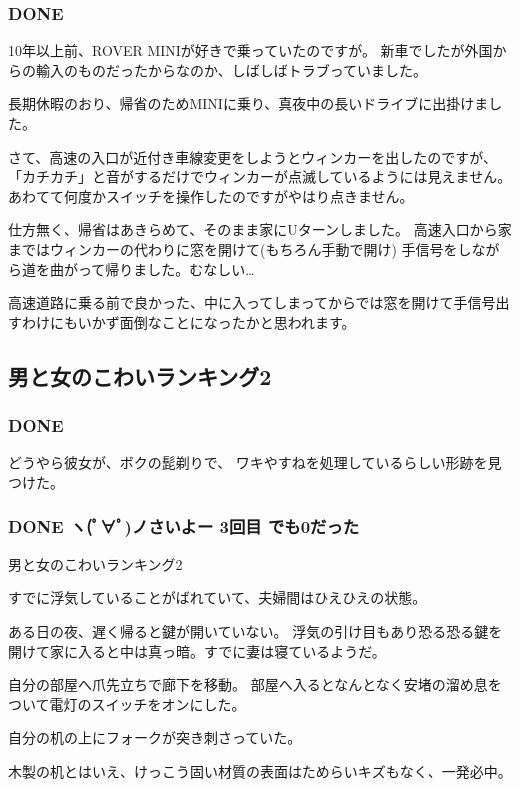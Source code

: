 \documentclass[11pt]{article}
\begin{document}
\subsubsection{\textbf{DONE}}
\label{sec-122_1_1}

10年以上前、ROVER MINIが好きで乗っていたのですが。
新車でしたが外国からの輸入のものだったからなのか、しばしばトラブっていました。

長期休暇のおり、帰省のためMINIに乗り、真夜中の長いドライブに出掛けました。

さて、高速の入口が近付き車線変更をしようとウィンカーを出したのですが、「カチカチ」と音がするだけでウィンカーが点滅しているようには見えません。
あわてて何度かスイッチを操作したのですがやはり点きません。

仕方無く、帰省はあきらめて、そのまま家にUターンしました。
高速入口から家まではウィンカーの代わりに窓を開けて(もちろん手動で開け) 手信号をしながら道を曲がって帰りました。むなしい\ldots{}

高速道路に乗る前で良かった、中に入ってしまってからでは窓を開けて手信号出すわけにもいかず面倒なことになったかと思われます。
\subsection{男と女のこわいランキング2}
\label{sec-122_2}
\subsubsection{\textbf{DONE}}
\label{sec-122_2_1}

どうやら彼女が、ボクの髭剃りで、
ワキやすねを処理しているらしい形跡を見つけた。
\subsubsection{\textbf{DONE} ヽ(ﾟ∀ﾟ)ノさいよー 3回目 でも0だった}
\label{sec-122_2_2}

男と女のこわいランキング2
 
すでに浮気していることがばれていて、夫婦間はひえひえの状態。

ある日の夜、遅く帰ると鍵が開いていない。
浮気の引け目もあり恐る恐る鍵を開けて家に入ると中は真っ暗。すでに妻は寝ているようだ。

自分の部屋へ爪先立ちで廊下を移動。
部屋へ入るとなんとなく安堵の溜め息をついて電灯のスイッチをオンにした。

 自分の机の上にフォークが突き刺さっていた。

木製の机とはいえ、けっこう固い材質の表面はためらいキズもなく、一発必中。
\end{document}
